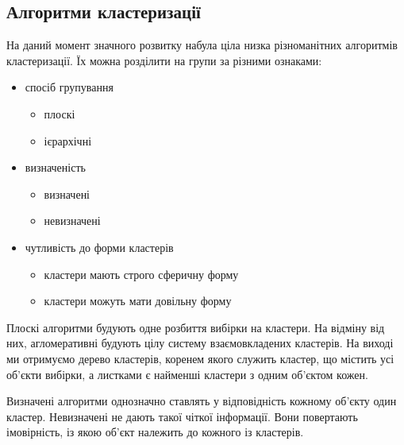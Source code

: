 \subsection{Алгоритми кластеризації}
    На даний момент значного розвитку набула ціла низка різноманітних алгоритмів кластеризації. Їх можна розділити на групи за різними ознаками:
    \begin{itemize}
        \item спосіб групування
            \begin{itemize}
                \item плоскі
                \item ієрархічні
            \end{itemize}
        \item визначеність 
            \begin{itemize}
                \item визначені
                \item невизначені
            \end{itemize}
        \item чутливість до форми кластерів 
            \begin{itemize}
                \item кластери мають строго сферичну форму
                \item кластери можуть мати довільну форму
            \end{itemize}
    \end{itemize}
    
    Плоскі алгоритми будують одне розбиття вибірки на кластери. На відміну від них, агломеративні будують цілу систему взаємовкладених кластерів. На виході ми отримуємо дерево кластерів, коренем якого служить кластер, що містить усі об'єкти вибірки, а листками є найменші кластери з одним об'єктом кожен.
    
    Визначені алгоритми однозначно ставлять у відповідність кожному об'єкту один кластер. Невизначені не дають такої чіткої інформації. Вони повертають імовірність, із якою об'єкт належить до кожного із кластерів.
